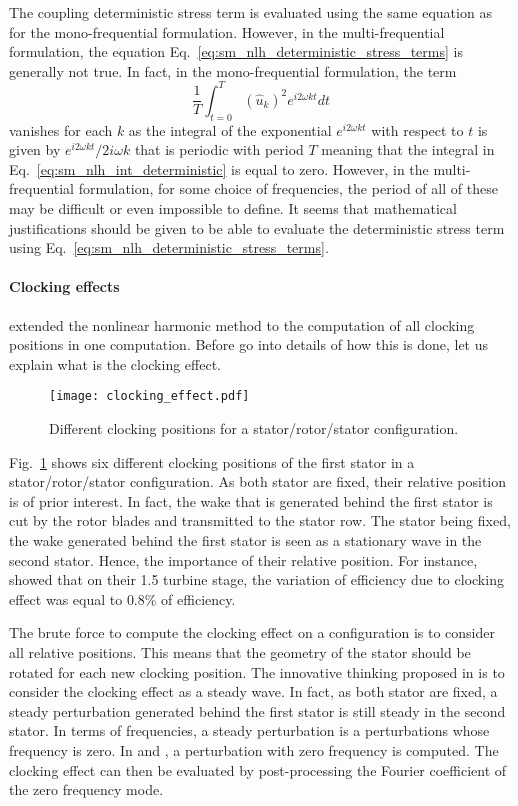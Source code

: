 The coupling deterministic stress term is evaluated using the
same equation as for the mono-frequential formulation.
However, in the multi-frequential formulation, 
the equation Eq.~\ref{eq:sm_nlh_deterministic_stress_terms}
is generally not true.
In fact, in the mono-frequential formulation, the term
\begin{equation}
	\frac{1}{T} \int_{t=0}^{T} (\widehat{u}_k)^2
		e^{i 2 \omega k t} dt
	\label{eq:sm_nlh_int_deterministic}
\end{equation}
vanishes for each $k$ as the integral of the
exponential $e^{i 2 \omega k t}$ with respect to $t$
is given by $e^{i 2 \omega k t} / 2 i \omega k$ that is
periodic with period $T$ meaning that the integral in 
Eq.~\ref{eq:sm_nlh_int_deterministic} is equal to zero. 
However, in the multi-frequential
formulation, for some choice of frequencies, the period of all
of these may be difficult or even impossible to define. It
seems that mathematical justifications should be given
to be able to evaluate the deterministic stress term 
using Eq.~\ref{eq:sm_nlh_deterministic_stress_terms}.

\paragraph{Clocking effects}
\citet{He2002} extended the nonlinear harmonic method to
the computation of all clocking positions in one computation. Before
go into details of how this is done, let us explain what is
the clocking effect.
\begin{figure}[htbp]
  \centering 
  \texttt{[image: clocking\_effect.pdf]}
  \caption{Different clocking positions for a stator/rotor/stator
  configuration.}
  \label{fig:sm_nlh_clocking_effect}
\end{figure}
Fig.~\ref{fig:sm_nlh_clocking_effect} shows six
different clocking positions of the first stator
in a stator/rotor/stator configuration.
As both stator are fixed, their relative position is of 
prior interest. In fact, the wake that is generated behind the first stator
is cut by the rotor blades and transmitted to 
the stator row. The stator being fixed, the wake generated
behind the first stator is seen as a stationary wave in the second stator.
Hence, the importance of their relative position. For instance,
\citet{Huber1996} showed that
on their 1.5 turbine stage, the variation of efficiency due to clocking
effect was equal to $0.8\%$ of efficiency.

The brute force to compute the clocking effect on a
configuration is to consider all relative positions. This means
that the geometry of the stator should be rotated for each new 
clocking position. The innovative thinking proposed in 
\citet{He2002} is to consider the clocking effect as a steady wave.
In fact, as both stator are fixed, a steady perturbation
generated behind the first stator is still steady in the second stator.
In terms of frequencies, a steady perturbation is a perturbations 
whose frequency is zero. In \citet{He2002} and \citet{Vilmin2009}, 
a perturbation with zero frequency
is computed. The clocking effect can then be evaluated by
post-processing the Fourier coefficient of the zero frequency mode.

